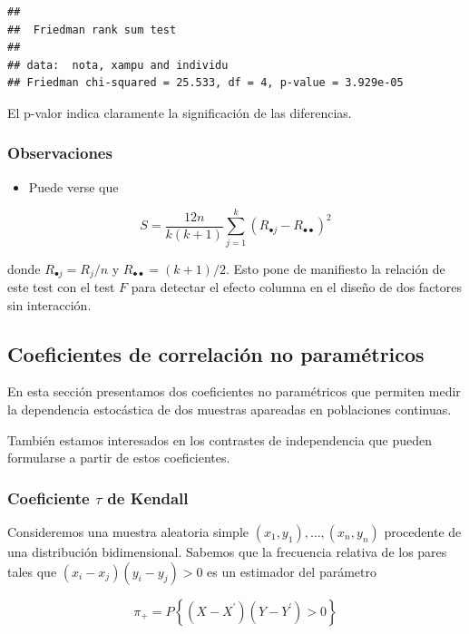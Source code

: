 \documentclass[
]{article}
\providecommand{\tightlist}{%
  \setlength{\itemsep}{0pt}\setlength{\parskip}{0pt}}
\begin{document}
\begin{verbatim}
## 
##  Friedman rank sum test
## 
## data:  nota, xampu and individu
## Friedman chi-squared = 25.533, df = 4, p-value = 3.929e-05
\end{verbatim}

El p-valor indica claramente la significación de las diferencias.

\subsubsection{Observaciones}\label{observaciones-6}

\begin{itemize}
\tightlist
\item
  Puede verse que
\end{itemize}

\[
S=\frac{12 n}{k(k+1)} \sum_{j=1}^{k}\left(R_{\bullet j}-R_{\bullet \bullet}\right)^{2}
\]

donde \(R_{\bullet j}=R_{j} / n\) y \(R_{\bullet \bullet}=(k+1) / 2\). Esto pone de manifiesto la relación de este test con el test \(F\) para detectar el efecto columna en el diseño de dos factores sin interacción.

\subsection{Coeficientes de correlación no paramétricos}\label{coeficientes-de-correlaciuxf3n-no-paramuxe9tricos}

En esta sección presentamos dos coeficientes no paramétricos que permiten medir la dependencia estocástica de dos muestras apareadas en poblaciones continuas.

También estamos interesados en los contrastes de independencia que pueden formularse a partir de estos coeficientes.

\subsubsection{\texorpdfstring{Coeficiente \(\tau\) de Kendall}{Coeficiente \textbackslash tau de Kendall}}\label{coeficiente-tau-de-kendall}

Consideremos una muestra aleatoria simple \((x_{1}, y_{1}), \ldots, (x_{n}, y_{n})\) procedente de una distribución bidimensional. Sabemos que la frecuencia relativa de los pares tales que \((x_{i}-x_{j})(y_{i}-y_{j})>0\) es un estimador del parámetro

\[
\pi_{+}=P\left\{(X-X^{\prime})(Y-Y^{\prime})>0\right\}
\]
\end{document}
